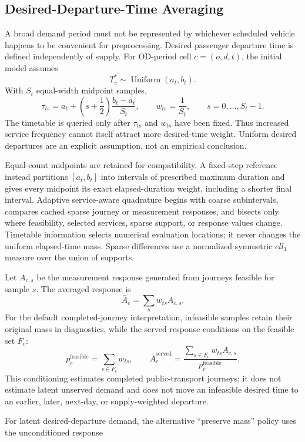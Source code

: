 \subsection{Desired-Departure-Time Averaging}

A broad demand period must not be represented by whichever scheduled vehicle
happens to be convenient for preprocessing. Desired passenger departure time
is defined independently of supply. For OD-period cell $c=(o,d,t)$, the initial
model assumes
\[
 T_c^*\sim\operatorname{Uniform}(a_t,b_t).
\]
With $S_t$ equal-width midpoint samples,
\[
 \tau_{ts}=a_t+\left(s+\frac12\right)\frac{b_t-a_t}{S_t},
 \qquad w_{ts}=\frac1{S_t},
 \qquad s=0,\ldots,S_t-1.
\]
The timetable is queried only after $\tau_{ts}$ and $w_{ts}$ have been fixed.
Thus increased service frequency cannot itself attract more desired-time
weight. Uniform desired departures are an explicit assumption, not an
empirical conclusion.

Equal-count midpoints are retained for compatibility.  A fixed-step reference
instead partitions $[a_t,b_t]$ into intervals of prescribed maximum duration
and gives every midpoint its exact elapsed-duration weight, including a shorter
final interval.  Adaptive service-aware quadrature begins with coarse
subintervals, compares cached sparse journey or measurement responses, and
bisects only where feasibility, selected services, sparse support, or response
values change.  Timetable information selects numerical evaluation locations;
it never changes the uniform elapsed-time mass.  Sparse differences use a
normalized symmetric $ell_1$ measure over the union of supports.

Let $A_{c,s}$ be the measurement response generated from journeys feasible for
sample $s$. The averaged response is
\[
 \bar A_c=\sum_s w_{ts}A_{c,s}.
\]
For the default completed-journey interpretation, infeasible samples retain
their original mass in diagnostics, while the served response conditions on
the feasible set $F_c$:
\[
 p_c^{\mathrm{feasible}}=\sum_{s\in F_c}w_{ts},
 \qquad
 \bar A_c^{\mathrm{served}}
 =\frac{\sum_{s\in F_c}w_{ts}A_{c,s}}
        {p_c^{\mathrm{feasible}}}.
\]
This conditioning estimates completed public-transport journeys; it does not
estimate latent unserved demand and does not move an infeasible desired time to
an earlier, later, next-day, or supply-weighted departure.

For latent desired-departure demand, the alternative
``preserve mass'' policy uses the unconditioned response

